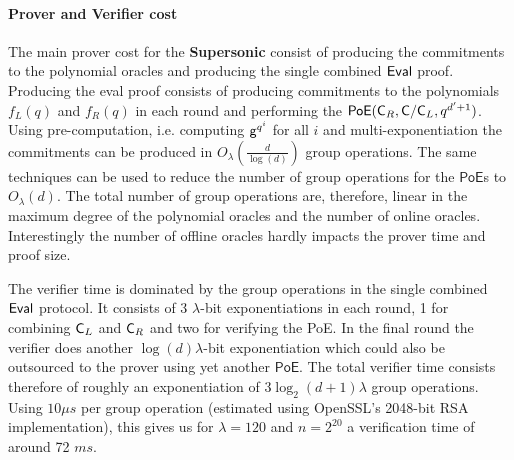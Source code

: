 \paragraph{Prover and Verifier cost}
The main prover cost for the \textsf{\textbf{Supersonic}} consist of producing the commitments to the polynomial oracles and producing the single combined $\textsf{{Eval}}$ proof.
Producing the eval proof consists of producing commitments to the polynomials $f_L(q)$ and $f_R(q)$ in each round and performing the $\textsf{PoE}(\mathsf{C}_R,\mathsf{C}/\mathsf{C}_L,q^{d'+1})$. Using pre-computation, i.e. computing $\mathsf{g}^{q^i}$ for all $i$ and multi-exponentiation the commitments can be produced in $O_\lambda(\frac{d}{\log(d)})$ group operations. The same techniques can be used to reduce the number of group operations for the $\textsf{PoE}$s to $O_\lambda(d)$. The total number of group operations are, therefore, linear in the maximum degree of the polynomial oracles and the number of online oracles. Interestingly the number of offline oracles hardly impacts the prover time and proof size.
 
 The verifier time is dominated by the group operations in the single combined $\textsf{{Eval}}$ protocol.
It consists of 3 $\lambda$-bit exponentiations in each round, 1 for combining $\mathsf{C}_L$ and $\mathsf{C}_R$ and two for verifying the \textsf{PoE}. In the final round the verifier does another $\log(d)\lambda$-bit exponentiation which could also be outsourced to the prover using yet another $\textsf{PoE}$. The total verifier time consists therefore of roughly an exponentiation of $3 \log_2(d+1) \lambda$ group operations. 
Using $10\mu s$ per group operation (estimated using OpenSSL's 2048-bit RSA implementation), this gives us for $\lambda=120$ and $n=2^{20}$ a verification time of around 72 $ms$. 

